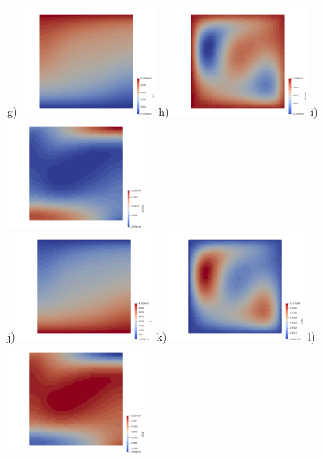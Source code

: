 \begin{center}
g)\includegraphics[width=4.5cm]{python_codes/fieldstone_24/EBA_104/rho.png}  
h)\includegraphics[width=4.5cm]{python_codes/fieldstone_24/EBA_104/drhodx.png}  
i)\includegraphics[width=4.5cm]{python_codes/fieldstone_24/EBA_104/drhody.png} \\ 
j)\includegraphics[width=4.5cm]{python_codes/fieldstone_24/EBA_104/T.png} 
k)\includegraphics[width=4.5cm]{python_codes/fieldstone_24/EBA_104/dTdx.png}
l)\includegraphics[width=4.5cm]{python_codes/fieldstone_24/EBA_104/dTdy.png}  \\

\end{center}
